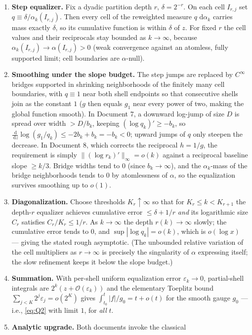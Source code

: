 \documentclass[11pt,oneside]{article}
\theoremstyle{definition}
\theoremstyle{remark}
\newcommand{\dd}{\,\mathrm d}
\newcommand{\bigO}{\mathcal O}
\begin{document}
\begin{enumerate}
\item \textbf{Step equalizer.}  Fix a dyadic partition depth $r$,
$\delta=2^{-r}$.  On each cell $I_{r,j}$ set
$q\equiv\delta/\alpha_k(I_{r,j})$.  Then every cell of the reweighted
measure $q\,\dd\alpha_k$ carries mass exactly $\delta$, so its
cumulative function is within $\delta$ of $z$.  For fixed $r$ the cell
values and their reciprocals stay bounded as $k\to\infty$, because
$\alpha_k(I_{r,j})\to\alpha(I_{r,j})>0$ (weak convergence against an
atomless, fully supported limit; cell boundaries are $\alpha$-null).
\item \textbf{Smoothing under the slope budget.}  The step jumps are
replaced by $C^\infty$ bridges supported in shrinking neighborhoods of
the finitely many cell boundaries, with $q\equiv1$ near both shell
endpoints so that consecutive shells join as the constant $1$ ($g$
then equals $g_1$ near every power of two, making the global function
smooth).  In Document 7, a downward log-jump of size $D$ is spread over
width $>D/b_k$, keeping $(\log q_k)'\ge-b_k$, so
$\frac{\dd}{\dd z}\log(g_1/q_k)\le-2b_k+b_k=-b_k<0$; upward jumps of
$q$ only steepen the decrease.  In Document 8, which corrects the
reciprocal $h=1/g$, the requirement is simply
$\|(\log r_k)'\|_\infty=o(k)$ against a reciprocal baseline slope
$\ge k/3$.  Bridge widths tend to $0$ (since $b_k\to\infty$), and the
$\alpha_k$-mass of the bridge neighborhoods tends to $0$ by
atomlessness of $\alpha$, so the equalization survives smoothing up to
$o(1)$.
\item \textbf{Diagonalization.}  Choose thresholds $K_r\uparrow\infty$
so that for $K_r\le k<K_{r+1}$ the depth-$r$ equalizer achieves
cumulative error $\le\delta+1/r$ \emph{and} its logarithmic size $C_r$
satisfies $C_r/K_r\le1/r$.  As $k\to\infty$ the depth $r(k)\to\infty$
slowly; the cumulative error tends to $0$, and
$\sup|\log q_k|=o(k)$, which is $o(\log x)$ --- giving the stated rough
asymptotic.  (The unbounded relative variation of the cell multipliers
as $r\to\infty$ is precisely the singularity of $\alpha$ expressing
itself; the slow refinement keeps it below the slope budget.)
\item \textbf{Summation.}  With per-shell uniform equalization error
$\varepsilon_k\to0$, partial-shell integrals are $2^k(z+\bigO(\varepsilon_k))$
and the elementary Toeplitz bound
$\sum_{j<K}2^j\varepsilon_j=o(2^K)$ gives
$\int_{t_0}^t|f|/g_0=t+o(t)$ for the smooth gauge $g_0$ --- i.e.,
\eqref{eq:Q2} with limit $1$, for \emph{all} $t$.
\item \textbf{Analytic upgrade.}  Both documents invoke the classical

\end{enumerate}
\end{document}

